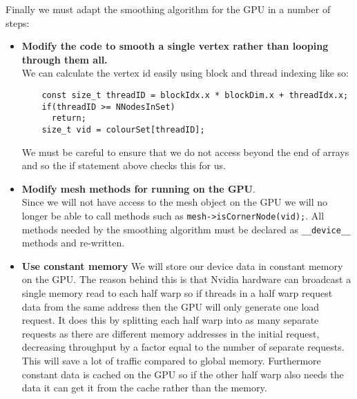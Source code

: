 Finally we must adapt the smoothing algorithm for the GPU in a number of steps:
\begin{itemize}
  \item \textbf{Modify the code to smooth a single vertex rather than looping through them all.} \\
        We can calculate the vertex id easily using block and thread indexing like so:
        \begin{verbatim}
    const size_t threadID = blockIdx.x * blockDim.x + threadIdx.x;
    if(threadID >= NNodesInSet)
      return;
    size_t vid = colourSet[threadID];
        \end{verbatim}
        We must be careful to ensure that we do not access beyond the end of arrays and so the if statement above checks this for us.
  \item \textbf{Modify mesh methods for running on the GPU}. \\
        Since we will not have access to the mesh object on the GPU we will no longer be able to call methods such as \verb!mesh->isCornerNode(vid);!. All methods needed by the smoothing algorithm must be declared as \verb!__device__! methods and re-written.
  \item \textbf{Use constant memory}
        We will store our device data in constant memory on the GPU. The reason behind this is that Nvidia hardware can broadcast a single memory read to each half warp so if threads in a half warp request data from the same address then the GPU will only generate one load request.\cite{const_mem} It does this by splitting each half warp into as many separate requests as there are different memory addresses in the initial request, decreasing throughput by a factor equal to the number of separate requests.\cite{half_warp_broadcast} This will save a lot of traffic compared to global memory.
        Furthermore constant data is cached on the GPU so if the other half warp also needs the data it can get it from the cache rather than the memory.

\end{itemize}

